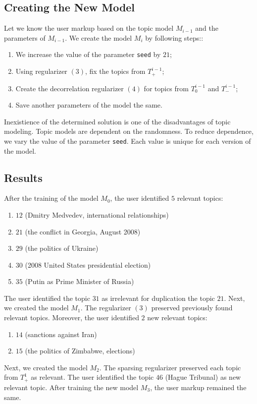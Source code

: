 \documentclass{article}
\begin{document}
\subsection{Creating the New Model}

Let we know the user markup based on the topic model $M_{i - 1}$ and the parameters of $M_{i - 1}$.
We create the model $M_i$ by following steps::
\begin{enumerate}
    \item We increase the value of the parameter \texttt{seed} by $21$;
    \item Using regularizer $(3)$, fix the topics from $T_+^{i - 1}$;
    \item Create the decorrelation regularizer $(4)$ for topics from $T_0^{i - 1}$ and $T_-^{i - 1}$;
    \item Save another parameters of the model the same.
\end{enumerate}
Inexistience of the determined solution \citep{bigartm} is one of the disadvantages of topic modeling. Topic models are dependent on the randomness. To reduce dependence, we vary the value of the parameter \texttt{seed}. Each value is unique for each version of the model.

\subsection{Results}

After the training of the model $M_0$, the user identified $5$ relevant topics:

\begin{enumerate}
    \item $12$ (Dmitry Medvedev, international relationships)
    \item $21$ (the conflict in Georgia, August 2008)
    \item $29$ (the politics of Ukraine)
    \item $30$ (2008 United States presidential election)
    \item $35$ (Putin as Prime Minister of Russia)
\end{enumerate}

The user identified the topic $31$ as irrelevant for duplication the topic $21$.
Next, we created the model $M_1$. The regularizer $(3)$ preserved previously found relevant topics. Moreover, the user identified $2$ new relevant topics:
\begin{enumerate}
    \item $14$ (sanctions against Iran)
    \item $15$ (the politics of Zimbabwe, elections)
\end{enumerate}
Next, we created the model $M_2$. The sparsing regularizer preserved each topic from $T_+^1$ as relevant. The user identified the topic $46$ (Hague Tribunal) as new relevant topic.
After training the new model $M_3$, the user markup remained the same.
\end{document}
